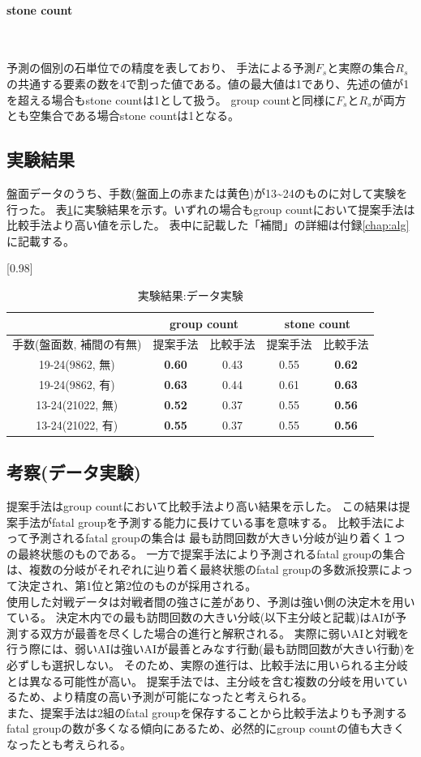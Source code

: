 \paragraph{stone count}~
\par 予測の個別の石単位での精度を表しており、
手法による予測$F_s$と実際の集合$R_s$の共通する要素の数を4で割った値である。値の最大値は1であり、先述の値が1を超える場合もstone countは1として扱う。
group countと同様に$F_s$と$R_s$が両方とも空集合である場合stone countは1となる。
\subsection{実験結果}
盤面データのうち、手数(盤面上の赤または黄色)が13\sim24のものに対して実験を行った。
表\ref{table:result-online}に実験結果を示す。いずれの場合もgroup countにおいて提案手法は比較手法より高い値を示した。
表中に記載した「補間」の詳細は付録\ref{chap:alg}に記載する。
\begin{table}[H]
	\caption{実験結果:データ実験}
	\centering
	\scalebox{0.98}[0.98]{
		\begin{tabular}{c|c|c|c|c}
			\multicolumn{1}{c}{} & \multicolumn{2}{|c|}{group count} 
			& \multicolumn{2}{c|}{stone count}\\ \hline \hline
			手数(盤面数, 補間の有無)    & 提案手法 & 比較手法 & 提案手法 & 比較手法 \\ \hline
			19-24(9862, 無)    & \bf{0.60} & 0.43 & 0.55 & \bf{0.62} \\
			19-24(9862, 有)    & \bf{0.63} & 0.44 & 0.61 & \bf{0.63}  \\
			13-24(21022, 無)   & \bf{0.52} & 0.37 & 0.55 & \bf{0.56}  \\
			13-24(21022, 有)   & \bf{0.55} & 0.37 & 0.55 & \bf{0.56}  \\
		\end{tabular}
	}
	\label{table:result-online}
\end{table}
\subsection{考察(データ実験)}
提案手法はgroup countにおいて比較手法より高い結果を示した。
この結果は提案手法がfatal groupを予測する能力に長けている事を意味する。
比較手法によって予測されるfatal groupの集合は
最も訪問回数が大きい分岐が辿り着く１つの最終状態のものである。
一方で提案手法により予測されるfatal groupの集合は、複数の分岐がそれぞれに辿り着く最終状態のfatal groupの多数派投票によって決定され、第1位と第2位のものが採用される。\\
使用した対戦データは対戦者間の強さに差があり、予測は強い側の決定木を用いている。
決定木内での最も訪問回数の大きい分岐(以下主分岐と記載)はAIが予測する双方が最善を尽くした場合の進行と解釈される。
実際に弱いAIと対戦を行う際には、弱いAIは強いAIが最善とみなす行動(最も訪問回数が大きい行動)を必ずしも選択しない。
そのため、実際の進行は、比較手法に用いられる主分岐とは異なる可能性が高い。
提案手法では、主分岐を含む複数の分岐を用いているため、より精度の高い予測が可能になったと考えられる。\\
また、提案手法は2組のfatal groupを保存することから比較手法よりも予測するfatal groupの数が多くなる傾向にあるため、必然的にgroup countの値も大きくなったとも考えられる。


